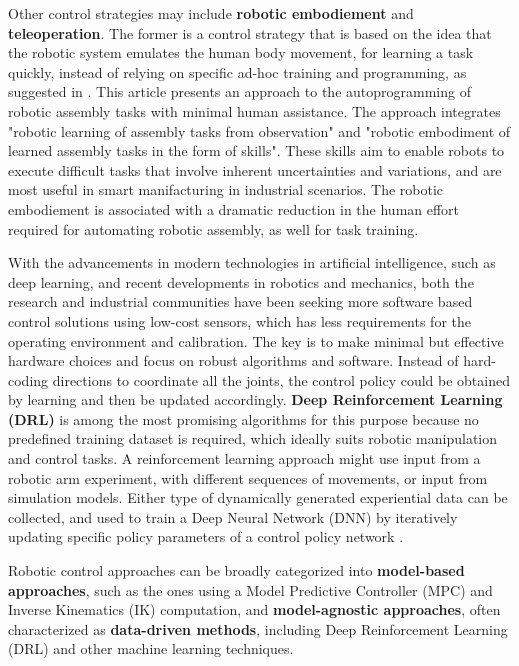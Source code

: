 Other control strategies may include \textbf{robotic embodiement} and \textbf{teleoperation}. 
The former is a control strategy that is based on the idea that the
robotic system emulates the human body movement, for learning a task quickly, instead of
relying on specific ad-hoc training and programming, as suggested in \cite{ji2021manufacturing}.
This article presents an approach to the autoprogramming of robotic assembly
tasks with minimal human assistance. The approach integrates
"robotic learning of assembly tasks from observation" and
"robotic embodiment of learned assembly tasks in the form of
skills". These skills aim to enable robots to execute difficult tasks that involve inherent 
uncertainties and variations, and are most useful in smart manifacturing in industrial
scenarios. The robotic embodiement is associated with a dramatic reduction in
the human effort required for automating robotic assembly, as well for task training.

With the advancements in modern technologies in artificial intelligence, such as
deep learning, and recent developments in robotics and mechanics, both the research
and industrial communities have been seeking more software based control solutions
using low-cost sensors, which has less requirements for the operating environment and
calibration. The key is to make minimal but effective hardware choices and focus on robust
algorithms and software. Instead of hard-coding directions to coordinate all the joints,
the control policy could be obtained by learning and then be updated accordingly. \textbf{Deep
	Reinforcement Learning (DRL)} is among the most promising algorithms for this purpose
because no predefined training dataset is required, which ideally suits robotic manipulation
and control tasks. A reinforcement learning approach might use
input from a robotic arm experiment, with different sequences of movements, or input
from simulation models. Either type of dynamically generated experiential data can be
collected, and used to train a Deep Neural Network (DNN) by iteratively updating specific
policy parameters of a control policy network \cite{liu2021deep}.

Robotic control approaches can be broadly categorized into \textbf{model-based approaches}, such as
the ones using a Model Predictive Controller (MPC) and Inverse Kinematics (IK) computation,
and \textbf{model-agnostic approaches}, often characterized as \textbf{data-driven methods},
including Deep Reinforcement Learning (DRL) and other machine learning techniques.

